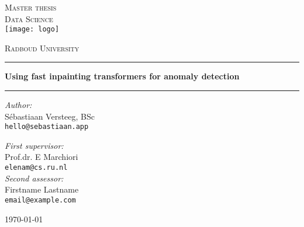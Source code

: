 \documentclass[11pt,a4paper]{report}
\begin{document}
\begin{titlepage}
\begin{center}
\textsc{\LARGE Master thesis\\Data Science}\\[.4cm]
\texttt{[image: logo]}

\vspace{0.4cm}
\textsc{\Large Radboud University}\\[2cm]
\hrule
\vspace{0.4cm}
\textbf{\huge Using fast inpainting transformers for anomaly detection\\[0.3cm]
\LARGE  
}
\hrule
\vspace{2cm}
\begin{minipage}[t]{0.45\textwidth}
\begin{flushleft} \large
\textit{Author:}\\
Sébastiaan Versteeg, BSc\\
\texttt{hello@sebastiaan.app}
\end{flushleft}
\end{minipage}
\begin{minipage}[t]{0.45\textwidth}
\begin{flushright} \large
\textit{First supervisor:}\\
Prof.dr. E Marchiori\\
\texttt{elenam@cs.ru.nl}\\[1.3cm]
\textit{Second assessor:}\\
Firstname Lastname\\
\texttt{email@example.com}
\end{flushright}
\end{minipage}
\vfill
{\large \today}
\end{center}
\end{titlepage}



\tableofcontents











\appendix


\newpage
\listoftodos[Notes]
\end{document}
